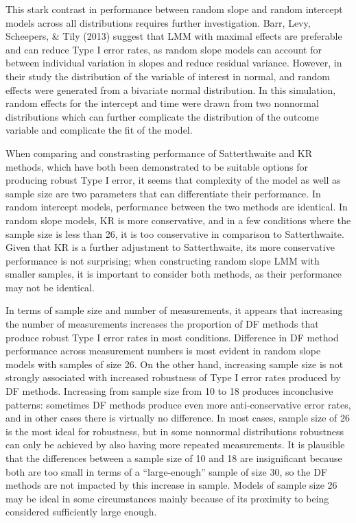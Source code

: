 \documentclass[12pt, twoside]{amherstthesis}
\begin{document}
This stark contrast in performance between random slope and random intercept models across all distributions requires further investigation. Barr, Levy, Scheepers, \& Tily (2013) suggest that LMM with maximal effects are preferable and can reduce Type I error rates, as random slope models can account for between individual variation in slopes and reduce residual variance. However, in their study the distribution of the variable of interest in normal, and random effects were generated from a bivariate normal distribution. In this simulation, random effects for the intercept and time were drawn from two nonnormal distributions which can further complicate the distribution of the outcome variable and complicate the fit of the model.

When comparing and constrasting performance of Satterthwaite and KR methods, which have both been demonstrated to be suitable options for producing robust Type I error, it seems that complexity of the model as well as sample size are two parameters that can differentiate their performance. In random intercept models, performance between the two methods are identical. In random slope models, KR is more conservative, and in a few conditions where the sample size is less than 26, it is too conservative in comparison to Satterthwaite. Given that KR is a further adjustment to Satterthwaite, its more conservative performance is not surprising; when constructing random slope LMM with smaller samples, it is important to consider both methods, as their performance may not be identical.

In terms of sample size and number of measurements, it appears that increasing the number of measurements increases the proportion of DF methods that produce robust Type I error rates in most conditions. Difference in DF method performance across measurement numbers is most evident in random slope models with samples of size 26. On the other hand, increasing sample size is not strongly associated with increased robustness of Type I error rates produced by DF methods. Increasing from sample size from 10 to 18 produces inconclusive patterns: sometimes DF methods produce even more anti-conservative error rates, and in other cases there is virtually no difference. In most cases, sample size of 26 is the most ideal for robustness, but in some nonnormal distributions robustness can only be achieved by also having more repeated measurements. It is plausible that the differences between a sample size of 10 and 18 are insignificant because both are too small in terms of a ``large-enough'' sample of size 30, so the DF methods are not impacted by this increase in sample. Models of sample size 26 may be ideal in some circumstances mainly because of its proximity to being considered sufficiently large enough.
\end{document}
